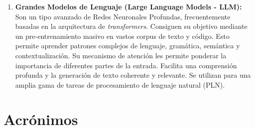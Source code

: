\begin{enumerate}
\begin{enumerate}
		\item \textbf{Grandes Modelos de Lenguaje (Large Language Models - LLM):}
		Son un tipo avanzado de Redes Neuronales Profundas, frecuentemente basadas en la arquitectura de \textit{transformers}. Consiguen su objetivo mediante un pre-entrenamiento masivo en vastos corpus de texto y código. Esto permite aprender patrones complejos de lenguaje, gramática, semántica y contextualización. Su mecanismo de atención les permite ponderar la importancia de diferentes partes de la entrada. Facilita una comprensión profunda y la generación de texto coherente y relevante. Se utilizan para una amplia gama de tareas de procesamiento de lenguaje natural (PLN).
	\end{enumerate}
\end{enumerate}

\section{Acrónimos}
\label{sec:acronimos}

